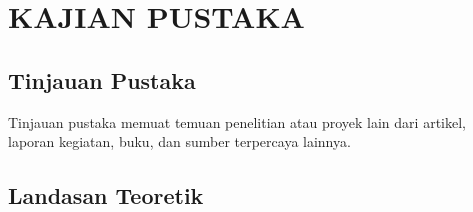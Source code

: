 \chapter{KAJIAN PUSTAKA}
\section{Tinjauan Pustaka}
Tinjauan pustaka memuat temuan penelitian atau proyek lain dari artikel, laporan kegiatan,
buku, dan sumber terpercaya lainnya.

\section{Landasan Teoretik}
